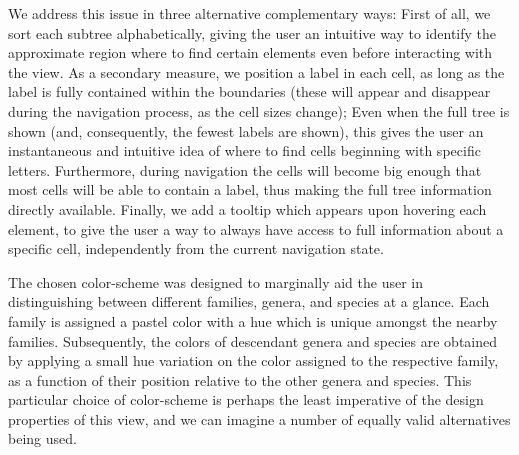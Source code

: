 \documentclass[letterpaper]{article} %
\begin{document}
We address this issue in three alternative complementary ways:  First of all,
we sort each subtree alphabetically, giving the user an intuitive way to
identify the approximate region where to find certain elements even before
interacting with the view.  As a secondary measure, we position a label in each
cell, as long as the label is fully contained within the boundaries (these will
appear and disappear during the navigation process, as the cell sizes change);
Even when the full tree is shown (and, consequently, the fewest labels are
shown), this gives the user an instantaneous and intuitive idea of where to
find cells beginning with specific letters.  Furthermore, during navigation the
cells will become big enough that most cells will be able to contain a label,
thus making the full tree information directly available.  Finally, we add
a tooltip which appears upon hovering each element, to give the user a way to
always have access to full information about a specific cell, independently
from the current navigation state.

The chosen color-scheme was designed to marginally aid the user in
distinguishing between different families, genera, and species at a glance.
Each family is assigned a pastel color with a hue which is unique amongst the
nearby families.  Subsequently, the colors of descendant genera and species are
obtained by applying a small hue variation on the color assigned to the
respective family, as a function of their position relative to the other genera
and species.  This particular choice of color-scheme is perhaps the least
imperative of the design properties of this view, and we can imagine a number
of equally valid alternatives being used.
\end{document}
